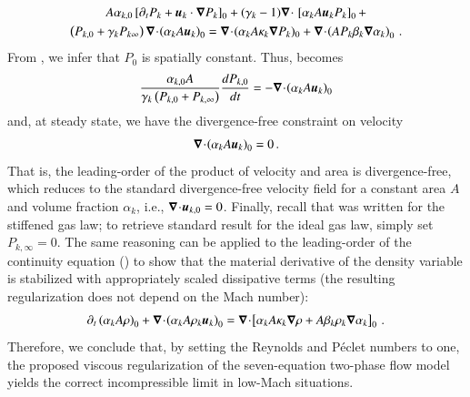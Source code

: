 \documentclass[preprint,10pt]{elsarticle}
\begin{document}
%
\begin{multline}\label{eq:asympt_equ3_ener}
A \alpha_{k,0} \left[ \partial_t  P_k  + \mbold u_k \cdot \grad  P_k \right]_0 + 
(\gamma_k-1) \div \ \left[ \alpha_k A \mbold u_k P_k \right]_0 +\\ 
\left( P_{k,0} +  \gamma_k P_{k\infty} \right) \div  \left(\alpha_k A \mbold u_k \right )_0 = 
\div (\alpha_k A \kappa_k \grad P_k)_0 + \div \left( A P_k \beta_k \grad \alpha_k \right)_0 \,.
\end{multline}
%
From , we infer that $P_0$ is spatially constant. Thus,  becomes
%
\begin{equation}\label{eq:div_free_energy}
\frac{\alpha_{k,0}  A}{\gamma_k\left( P_{k,0} + P_{k,\infty} \right)} \frac{d P_{k,0}}{dt} = - \boldsymbol\nabla\! \cdot \! \left( \alpha_k A \boldsymbol u_k \right)_0 
\end{equation}
%
and, at steady state, we have the divergence-free constraint on velocity
%
\begin{equation}
\boldsymbol\nabla\! \cdot \! \left( \alpha_k A \boldsymbol u_k \right)_0  = 0 \, .
\end{equation}
%
That is, the leading-order of the product of velocity and area is divergence-free, which reduces to the standard divergence-free 
velocity field for a constant area $A$ and volume fraction $\alpha_k$, i.e., $\boldsymbol\nabla\! \cdot \! \boldsymbol u_{k,0}=0$. Finally, recall that 
 was written for the stiffened gas law; to retrieve standard result for the ideal gas law, simply set $P_{k,\infty}=0$. 
%
The same reasoning can be applied to the leading-order 
of the continuity equation () to show that the material derivative of the density variable is stabilized with 
appropriately scaled dissipative terms (the resulting regularization does not depend on the Mach number):
\begin{multline}
\partial_t \left( \alpha_k A \rho\right)_0 + \boldsymbol\nabla\! \cdot \! \left( \alpha_k A \rho_k \boldsymbol u_k \right)_0 =
\boldsymbol\nabla\! \cdot \! \left[ \alpha_k A \kappa_k \boldsymbol\nabla \rho + A \beta_k \rho_k \boldsymbol\nabla \alpha_k \right]_0 \, .
\end{multline}
%
Therefore, we conclude that, by setting the Reynolds and P\'eclet numbers to one, the proposed viscous regularization
of the seven-equation two-phase flow model yields the correct incompressible limit in low-Mach situations.
%
\end{document}
